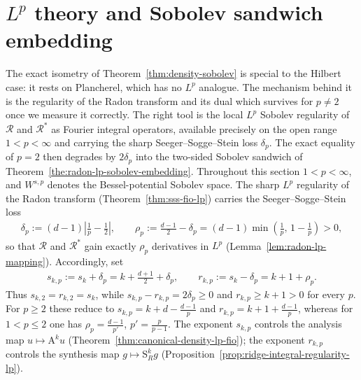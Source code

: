 \documentclass[12pt]{article}
\numberwithin{equation}{section}
\numberwithin{figure}{section}
\numberwithin{equation}{section}
\begin{document}
\section{\texorpdfstring{$L^p$}{Lp} theory and Sobolev sandwich embedding}
\label{sec:radon-lp-theory}

The exact isometry of Theorem~\ref{thm:density-sobolev} is special to the Hilbert
case: it rests on Plancherel, which has no $L^p$ analogue. The mechanism behind
it is the regularity of the Radon transform
and its dual which survives for $p\neq2$ once we measure it
correctly. The right tool is the local $L^p$ Sobolev regularity of $\mathcal R$
and $\mathcal R^*$ as Fourier integral operators, available precisely on the
open range $1<p<\infty$ and carrying the sharp Seeger--Sogge--Stein loss
$\delta_p$. The exact equality of $p=2$ then degrades by $2\delta_p$ into
the two-sided Sobolev sandwich of
Theorem~\ref{the:radon-lp-sobolev-embedding}. Throughout this section
$1<p<\infty$, and $W^{s,p}$ denotes the Bessel-potential Sobolev space.
The sharp $L^p$ regularity of the Radon transform
(Theorem~\ref{thm:sss-fio-lp}) carries the Seeger--Sogge--Stein loss
\begin{align}
    \delta_p:=(d-1)\left|\frac1p-\frac12\right|,
    \qquad
    \rho_p:=\frac{d-1}{2}-\delta_p
    =(d-1)\min\!\left(\frac1p,\,1-\frac1p\right)>0,
    \label{eq:deltap-rhop-def}
\end{align}
so that $\mathcal R$ and $\mathcal R^*$ gain exactly $\rho_p$ derivatives in $L^p$
(Lemma~\ref{lem:radon-lp-mapping}).  Accordingly, set
\begin{align*}
    s_{k,p}:=s_k+\delta_p=k+\frac{d+1}{2}+\delta_p,
    \qquad
    r_{k,p}:=s_k-\delta_p=k+1+\rho_p.
\end{align*}
Thus $s_{k,2}=r_{k,2}=s_k$, while $s_{k,p}-r_{k,p}=2\delta_p\ge0$ and
$r_{k,p}\ge k+1>0$ for every $p$.  For $p\ge2$ these reduce to
$s_{k,p}=k+d-\tfrac{d-1}{p}$ and $r_{k,p}=k+1+\tfrac{d-1}{p}$, whereas for
$1<p\le2$ one has $\rho_p=\tfrac{d-1}{p'}$, $p'=\tfrac{p}{p-1}$.  The exponent
$s_{k,p}$ controls the analysis map $u\mapsto\mathrm{A}^k  u$
(Theorem~\ref{thm:canonical-density-lp-fio}); the exponent $r_{k,p}$ controls the
synthesis map $g\mapsto\mathrm{S}^k_R g$
(Proposition~\ref{prop:ridge-integral-regularity-lp}).
\end{document}
